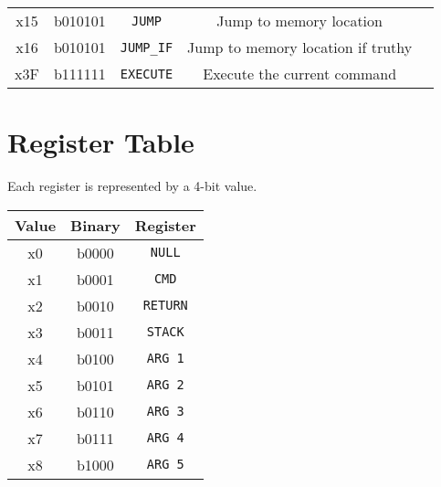 \documentclass[12pt,a4paper]{article}
\begin{document}
\begin{center}
\begin{tabular}{ c c c c c }
    \hline

    x15 & b010101 & \texttt{JUMP} & Jump to memory location \\

    x16 & b010101 & \texttt{JUMP\_IF} & Jump to memory location if truthy \\

    \hline

    x3F & b111111 & \texttt{EXECUTE} & Execute the current command \\
\end{tabular}
\end{center}

\section{Register Table}

Each register is represented by a 4-bit value.

\begin{center}
\begin{tabular}{c c c}
    \textbf{Value} & \textbf{Binary} & \textbf{Register} \\
    \hline

    x0 & b0000 & \texttt{NULL} \\

    \hline

    x1 & b0001 & \texttt{CMD} \\
    x2 & b0010 & \texttt{RETURN} \\
    x3 & b0011 & \texttt{STACK} \\

    \hline

    x4 & b0100 & \texttt{ARG 1} \\
    x5 & b0101 & \texttt{ARG 2} \\
    x6 & b0110 & \texttt{ARG 3} \\
    x7 & b0111 & \texttt{ARG 4} \\
    x8 & b1000 & \texttt{ARG 5} \\
\end{tabular}
\end{center}
\end{document}
